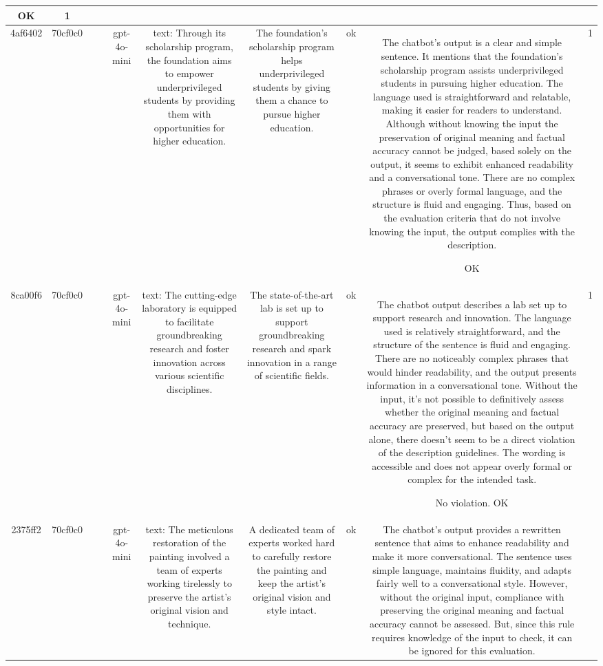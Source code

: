 \begin{table}[h!]
\begin{tabular}{|c|c|c|c|c|c|c|c|c|c|}
OK & 1\\
\hline
4af6402 & 70cf0c0 &  &  & gpt-4o-mini & text: Through its scholarship program, the foundation aims to empower underprivileged students by providing them with opportunities for higher education. & The foundation's scholarship program helps underprivileged students by giving them a chance to pursue higher education. & ok & The chatbot’s output is a clear and simple sentence. It mentions that the foundation's scholarship program assists underprivileged students in pursuing higher education. The language used is straightforward and relatable, making it easier for readers to understand. Although without knowing the input the preservation of original meaning and factual accuracy cannot be judged, based solely on the output, it seems to exhibit enhanced readability and a conversational tone. There are no complex phrases or overly formal language, and the structure is fluid and engaging. Thus, based on the evaluation criteria that do not involve knowing the input, the output complies with the description.

OK & 1\\
\hline
8ca00f6 & 70cf0c0 &  &  & gpt-4o-mini & text: The cutting-edge laboratory is equipped to facilitate groundbreaking research and foster innovation across various scientific disciplines. & The state-of-the-art lab is set up to support groundbreaking research and spark innovation in a range of scientific fields. & ok & The chatbot output describes a lab set up to support research and innovation. The language used is relatively straightforward, and the structure of the sentence is fluid and engaging. There are no noticeably complex phrases that would hinder readability, and the output presents information in a conversational tone. Without the input, it's not possible to definitively assess whether the original meaning and factual accuracy are preserved, but based on the output alone, there doesn't seem to be a direct violation of the description guidelines. The wording is accessible and does not appear overly formal or complex for the intended task.

No violation.
OK & 1\\
\hline
2375ff2 & 70cf0c0 &  &  & gpt-4o-mini & text: The meticulous restoration of the painting involved a team of experts working tirelessly to preserve the artist's original vision and technique. & A dedicated team of experts worked hard to carefully restore the painting and keep the artist's original vision and style intact. & ok & The chatbot's output provides a rewritten sentence that aims to enhance readability and make it more conversational. The sentence uses simple language, maintains fluidity, and adapts fairly well to a conversational style. However, without the original input, compliance with preserving the original meaning and factual accuracy cannot be assessed. But, since this rule requires knowledge of the input to check, it can be ignored for this evaluation.


\end{tabular}
\end{table}
